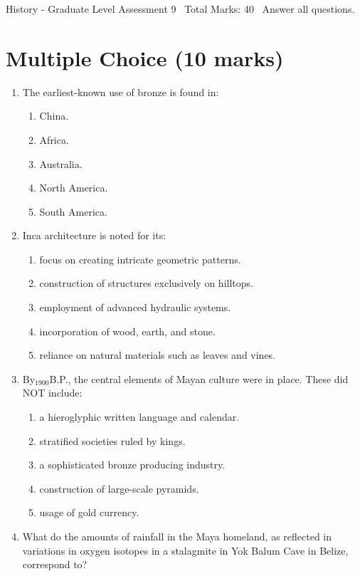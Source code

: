 \documentclass[12pt]{article}
\begin{document}
\begin{center}
History - Graduate Level Assessment 9 \
Total Marks: 40 \
Answer all questions.
\end{center}

\section*{Multiple Choice (10 marks)}
\begin{enumerate}[label=\arabic*.]
\item The earliest-known use of bronze is found in:
\begin{enumerate}[label=(\alph*)]
    \item China.
    \item Africa.
    \item Australia.
    \item North America.
    \item South America.
\end{enumerate}
\item Inca architecture is noted for its:
\begin{enumerate}[label=(\alph*)]
    \item focus on creating intricate geometric patterns.
    \item construction of structures exclusively on hilltops.
    \item employment of advanced hydraulic systems.
    \item incorporation of wood, earth, and stone.
    \item reliance on natural materials such as leaves and vines.
\end{enumerate}
\item By$_{1900}$B.P., the central elements of Mayan culture were in place. These did NOT include:
\begin{enumerate}[label=(\alph*)]
    \item a hieroglyphic written language and calendar.
    \item stratified societies ruled by kings.
    \item a sophisticated bronze producing industry.
    \item construction of large-scale pyramids.
    \item usage of gold currency.
\end{enumerate}
\item What do the amounts of rainfall in the Maya homeland, as reflected in variations in oxygen isotopes in a stalagmite in Yok Balum Cave in Belize, correspond to?

\end{enumerate}
\end{document}
